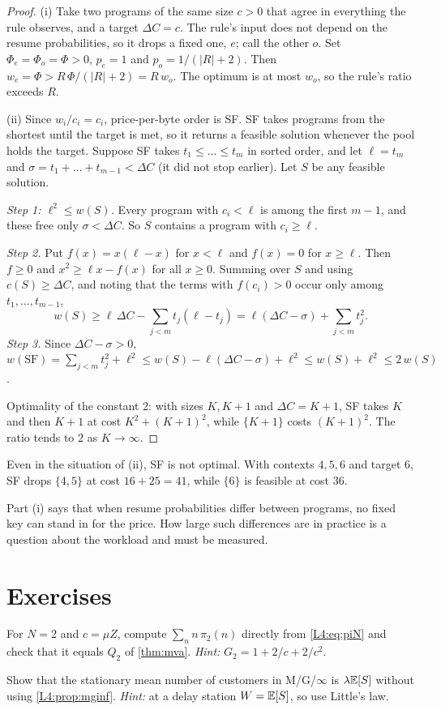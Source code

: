 \begin{proof}
(i) Take two programs of the same size $c>0$ that agree in everything the rule
observes, and a target $\Delta C=c$. The rule's input does not depend on the
resume probabilities, so it drops a fixed one, $e$; call the other $o$. Set
$\Phi_e=\Phi_o=\Phi>0$, $p_e=1$ and $p_o=1/(|R|+2)$. Then
$w_e=\Phi>R\,\Phi/(|R|+2)=R\,w_o$. The optimum is at most $w_o$, so the rule's
ratio exceeds $R$.

(ii) Since $w_i/c_i=c_i$, price-per-byte order is SF. SF takes programs from the
shortest until the target is met, so it returns a feasible solution whenever the
pool holds the target. Suppose SF takes $t_1\le\dots\le t_m$ in sorted order, and
let $\ell=t_m$ and $\sigma=t_1+\dots+t_{m-1}<\Delta C$ (it did not stop earlier).
Let $S$ be any feasible solution.

\emph{Step 1: $\ell^2\le w(S)$.} Every program with $c_i<\ell$ is among the first
$m-1$, and these free only $\sigma<\Delta C$. So $S$ contains a program with
$c_i\ge\ell$.

\emph{Step 2.} Put $f(x)=x(\ell-x)$ for $x<\ell$ and $f(x)=0$ for $x\ge\ell$. Then
$f\ge0$ and $x^2\ge\ell x-f(x)$ for all $x\ge0$. Summing over $S$ and using
$c(S)\ge\Delta C$, and noting that the terms with $f(c_i)>0$ occur only among
$t_1,\dots,t_{m-1}$,
\[
  w(S)\ge\ell\,\Delta C-\sum_{j<m}t_j(\ell-t_j)=\ell(\Delta C-\sigma)+\sum_{j<m}t_j^2 .
\]
\emph{Step 3.} Since $\Delta C-\sigma>0$,
$w(\mathrm{SF})=\sum_{j<m}t_j^2+\ell^2\le w(S)-\ell(\Delta C-\sigma)+\ell^2\le w(S)+\ell^2\le2\,w(S)$.

Optimality of the constant 2: with sizes $K,K+1$ and $\Delta C=K+1$, SF takes $K$
and then $K+1$ at cost $K^2+(K+1)^2$, while $\{K+1\}$ costs $(K+1)^2$. The ratio
tends to $2$ as $K\to\infty$.
\end{proof}

\begin{example}\label{L4:ex:sf}
Even in the situation of (ii), SF is not optimal. With contexts $4,5,6$ and target
$6$, SF drops $\{4,5\}$ at cost $16+25=41$, while $\{6\}$ is feasible at cost $36$.
\end{example}

Part (i) says that when resume probabilities differ between programs, no fixed
key can stand in for the price. How large such differences are in practice is a
question about the workload and must be measured.

\section{Exercises}

\begin{exercise}
For $N=2$ and $c=\mu Z$, compute $\sum_nn\,\pi_2(n)$ directly from
\eqref{L4:eq:piN} and check that it equals $Q_2$ of \cref{thm:mva}.
\emph{Hint:} $G_2=1+2/c+2/c^2$.
\end{exercise}

\begin{exercise}
Show that the stationary mean number of customers in M/G/$\infty$ is $\lambda\mathbb{E}[S]$
without using \cref{L4:prop:mginf}.
\emph{Hint:} at a delay station $W=\mathbb{E}[S]$, so use Little's law.
\end{exercise}
